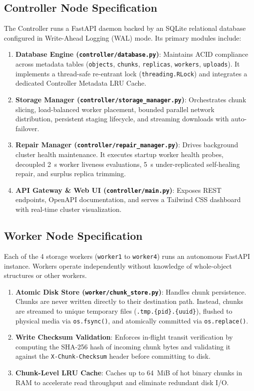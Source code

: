 \documentclass[11pt,a4paper]{article}
\begin{document}
\subsection{Controller Node Specification}
The Controller runs a FastAPI daemon backed by an SQLite relational database configured in Write-Ahead Logging (WAL) mode. Its primary modules include:
\begin{enumerate}
    \item \textbf{Database Engine (\texttt{controller/database.py})}: Maintains ACID compliance across metadata tables (\texttt{objects}, \texttt{chunks}, \texttt{replicas}, \texttt{workers}, \texttt{uploads}). It implements a thread-safe re-entrant lock (\texttt{threading.RLock}) and integrates a dedicated Controller Metadata LRU Cache.
    \item \textbf{Storage Manager (\texttt{controller/storage_manager.py})}: Orchestrates chunk slicing, load-balanced worker placement, bounded parallel network distribution, persistent staging lifecycle, and streaming downloads with auto-failover.
    \item \textbf{Repair Manager (\texttt{controller/repair_manager.py})}: Drives background cluster health maintenance. It executes startup worker health probes, decoupled 2~s worker liveness evaluations, 5~s under-replicated self-healing repair, and surplus replica trimming.
    \item \textbf{API Gateway \& Web UI (\texttt{controller/main.py})}: Exposes REST endpoints, OpenAPI documentation, and serves a Tailwind CSS dashboard with real-time cluster visualization.
\end{enumerate}

\subsection{Worker Node Specification}
Each of the 4 storage workers (\texttt{worker1} to \texttt{worker4}) runs an autonomous FastAPI instance. Workers operate independently without knowledge of whole-object structures or other workers.
\begin{enumerate}
    \item \textbf{Atomic Disk Store (\texttt{worker/chunk_store.py})}: Handles chunk persistence. Chunks are never written directly to their destination path. Instead, chunks are streamed to unique temporary files (\texttt{.tmp.\{pid\}.\{uuid\}}), flushed to physical media via \texttt{os.fsync()}, and atomically committed via \texttt{os.replace()}.
    \item \textbf{Write Checksum Validation}: Enforces in-flight transit verification by computing the SHA-256 hash of incoming chunk bytes and validating it against the \texttt{X-Chunk-Checksum} header before committing to disk.
    \item \textbf{Chunk-Level LRU Cache}: Caches up to 64~MiB of hot binary chunks in RAM to accelerate read throughput and eliminate redundant disk I/O.
\end{enumerate}
\end{document}
